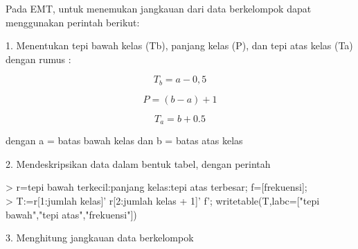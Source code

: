 \documentclass[a4paper,10pt]{article}
\begin{document}
\begin{eulernotebook}
\begin{eulercomment}
\begin{eulercomment}
\begin{eulercomment}
\begin{eulercomment}
\begin{eulercomment}
\begin{eulercomment}
\begin{eulercomment}
\begin{eulercomment}
\begin{eulercomment}
\begin{eulercomment}
\begin{eulercomment}
\begin{eulercomment}
\begin{eulercomment}
\begin{eulercomment}
\begin{eulercomment}
Pada EMT,  untuk menemukan jangkauan dari data berkelompok dapat
menggunakan perintah berikut:

1. Menentukan tepi bawah kelas (Tb), panjang kelas (P), dan tepi atas
kelas (Ta) dengan rumus :

\end{eulercomment}
\begin{eulerformula}
\[
T_b=a-0,5
\]
\end{eulerformula}
\begin{eulerformula}
\[
P=(b-a)+1
\]
\end{eulerformula}
\begin{eulerformula}
\[
T_a=b+0.5
\]
\end{eulerformula}
\begin{eulercomment}
dengan a = batas bawah kelas dan b = batas atas kelas

2. Mendeskripsikan data dalam bentuk tabel, dengan perintah

\textgreater{} r=tepi bawah terkecil:panjang kelas:tepi atas terbesar;
f=[frekuensi];\\
\textgreater{} T:=r[1:jumlah kelas]' \textbar{} r[2:jumlah kelas + 1]' \textbar{} f';
writetable(T,labc=["tepi bawah","tepi atas","frekuensi"])

3. Menghitung jangkauan data berkelompok


\end{eulercomment}
\end{eulercomment}
\end{eulercomment}
\end{eulercomment}
\end{eulercomment}
\end{eulercomment}
\end{eulercomment}
\end{eulercomment}
\end{eulercomment}
\end{eulercomment}
\end{eulercomment}
\end{eulercomment}
\end{eulercomment}
\end{eulercomment}
\end{eulercomment}
\end{eulernotebook}
\end{document}
